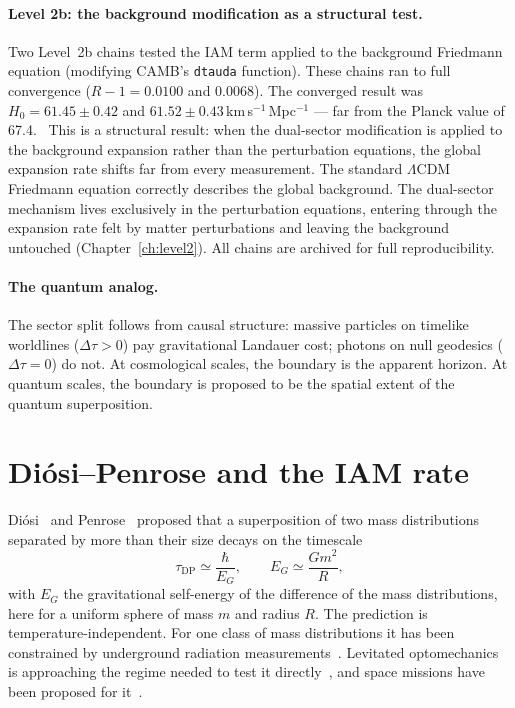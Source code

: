 \paragraph{Level 2b: the background modification as a structural test.} Two Level~2b chains tested the IAM term applied to the background Friedmann equation
(modifying CAMB's \texttt{dtauda} function). These chains ran to full convergence ($R-1=0.0100$ and $0.0068$). The converged result was
$H_0=61.45\pm0.42$ and $61.52\pm0.43$\,km\,s$^{-1}$\,Mpc$^{-1}$ --- far from the Planck value of 67.4. \measured\ This is a structural result: when the
dual-sector modification is applied to the background expansion rather than the perturbation equations, the global expansion rate shifts far from every
measurement. The standard $\Lambda$CDM Friedmann equation correctly describes the global background. The dual-sector mechanism lives exclusively in the
perturbation equations, entering through the expansion rate felt by matter perturbations and leaving the background untouched (Chapter~\ref{ch:level2}). \interp
All chains are archived for full reproducibility.

\paragraph{The quantum analog.} The sector split follows from causal structure: massive particles on timelike worldlines ($\Delta\tau>0$) pay
gravitational Landauer cost; photons on null geodesics ($\Delta\tau=0$) do not. At cosmological scales, the boundary is the apparent horizon. At quantum
scales, the boundary is proposed to be the spatial extent of the quantum superposition. \conjecture

\section{Di\'osi--Penrose and the IAM rate}\label{sec:gd_rate}
Di\'osi~\cite{Diosi1987,Diosi1989} and Penrose~\cite{Penrose1996} proposed that a superposition of two mass distributions separated by more than their size
decays on the timescale
\begin{equation}
 \tau_{\mathrm{DP}}\simeq\frac{\hbar}{E_G},\qquad E_G\simeq\frac{Gm^2}{R},\label{eq:gd_dp}
\end{equation}
with $E_G$ the gravitational self-energy of the difference of the mass distributions, here for a uniform sphere of mass $m$ and radius $R$. The prediction
is temperature-independent. For one class of mass distributions it has been constrained by underground radiation measurements~\cite{Donadi2021}. Levitated
optomechanics is approaching the regime needed to test it directly~\cite{RomeroIsart2011,Gonzalez2021,Delic2020,Neumeier2024,Rossi2025}, and space missions
have been proposed for it~\cite{Kaltenbaek2012}. \observed

